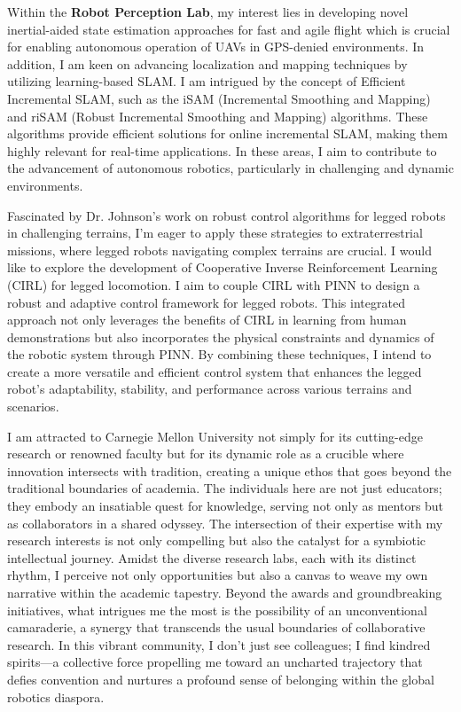\documentclass[12pt]{article}
\begin{document}
Within the \textbf{Robot Perception Lab}, my interest lies in developing novel inertial-aided state estimation approaches for fast and agile flight which is crucial for enabling autonomous operation of UAVs in GPS-denied environments. In addition, I am keen on advancing localization and mapping techniques by utilizing learning-based SLAM. I am intrigued by the concept of Efficient Incremental SLAM, such as the iSAM (Incremental Smoothing and Mapping) and riSAM (Robust Incremental Smoothing and Mapping) algorithms. These algorithms provide efficient solutions for online incremental SLAM, making them highly relevant for real-time applications. In these areas, I aim to contribute to the advancement of autonomous robotics, particularly in challenging and dynamic environments.

Fascinated by Dr. Johnson's work on robust control algorithms for legged robots in challenging terrains, I'm eager to apply these strategies to extraterrestrial missions, where legged robots navigating complex terrains are crucial. I would like to explore the development of Cooperative Inverse Reinforcement Learning (CIRL) for legged locomotion. I aim to couple CIRL with PINN to design a robust and adaptive control framework for legged robots. This integrated approach not only leverages the benefits of CIRL in learning from human demonstrations but also incorporates the physical constraints and dynamics of the robotic system through PINN. By combining these techniques, I intend to create a more versatile and efficient control system that enhances the legged robot's adaptability, stability, and performance across various terrains and scenarios. 


I am attracted to Carnegie Mellon University not simply for its cutting-edge research or renowned faculty but for its dynamic role as a crucible where innovation intersects with tradition, creating a unique ethos that goes beyond the traditional boundaries of academia. The individuals here are not just educators; they embody an insatiable quest for knowledge, serving not only as mentors but as collaborators in a shared odyssey. The intersection of their expertise with my research interests is not only compelling but also the catalyst for a symbiotic intellectual journey. Amidst the diverse research labs, each with its distinct rhythm, I perceive not only opportunities but also a canvas to weave my own narrative within the academic tapestry. Beyond the awards and groundbreaking initiatives, what intrigues me the most is the possibility of an unconventional camaraderie, a synergy that transcends the usual boundaries of collaborative research. In this vibrant community, I don't just see colleagues; I find kindred spirits—a collective force propelling me toward an uncharted trajectory that defies convention and nurtures a profound sense of belonging within the global robotics diaspora.
\end{document}
